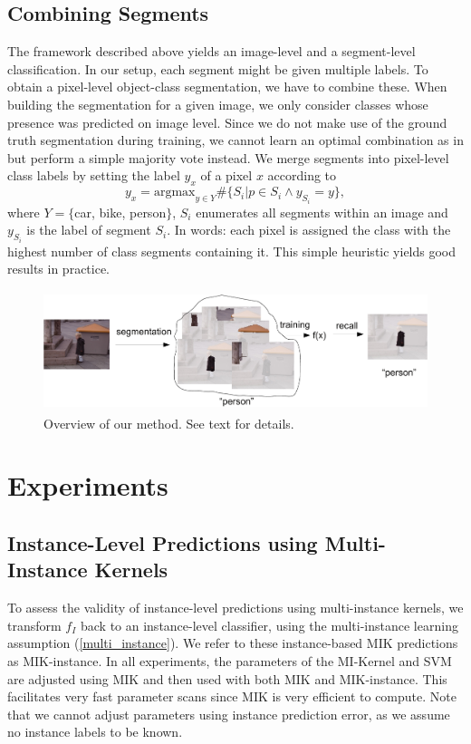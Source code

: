 \documentclass{llncs} %
\begin{document}
\subsection{Combining Segments}
The framework described above yields an image-level and a segment-level classification.
In our setup, each segment might be given multiple labels. To obtain a pixel-level object-class segmentation, we have to combine these. 
When building the segmentation for a given image, we only consider classes whose presence was predicted on image level.
Since we do not make use of the ground truth segmentation during training, we cannot learn an optimal combination as 
in \citet{li2010object} but perform a simple majority vote instead.
We merge segments into pixel-level class labels by setting
the label $y_x$ of a pixel $x$ according to
\begin{equation}
    y_x = \text{argmax}_{y \in Y} \#\{S_i | p \in S_i \land y_{S_i}=y \},
\end{equation}
where $Y= \{$car, bike, person$ \}$, $S_i$ enumerates all segments within an
image and $y_{S_i}$ is the label of segment $S_i$. In words: each pixel is
assigned the class with the highest number of class segments containing it.
This simple heuristic yields good results in practice.

\begin{figure}[tbp]
	\begin{center}
        \includegraphics[height=35mm]{images/scheme-crop.pdf}
	\end{center}
        \caption{Overview of our method. See text for details.}
\end{figure}
\section{Experiments}
\subsection{Instance-Level Predictions using Multi-Instance Kernels}
To assess the validity of instance-level predictions using multi-instance kernels, we transform $f_{I}$
back to an instance-level classifier, using the multi-instance learning
assumption (\eqref{multi_instance}). We refer to these instance-based MIK predictions
as MIK-instance. In all experiments, the parameters of the MI-Kernel
and SVM are adjusted using MIK and then used with both MIK and MIK-instance.
This facilitates very fast parameter scans since MIK is very efficient to
compute. Note that we cannot adjust parameters using instance prediction error, as we assume
no instance labels to be known.
\end{document}
